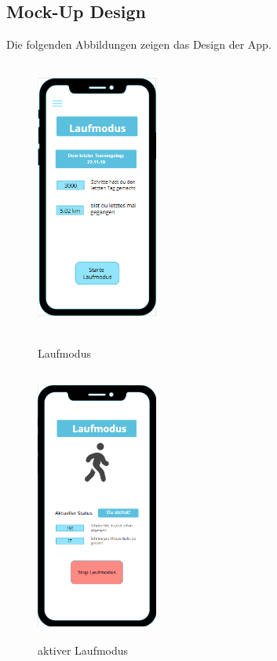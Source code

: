 \documentclass[a4paper,12pt]{article}
\begin{document}
\subsection{Mock-Up Design}
Die folgenden Abbildungen zeigen das Design der App.
\begin{figure}[ht!]
	\centering
		\begin{minipage}{0.4\textwidth}
			\includegraphics[width=4cm,height=9cm]{./Benutzeroberflaeche/Laufmodus.png}
			\caption{Laufmodus}
			\vspace{30px}
		\end{minipage}
			\hfill
		\begin{minipage}{0.4\textwidth}
			\includegraphics[width=4cm,height=9cm]{./Benutzeroberflaeche/Laufmodus_aktiv.png}
			\caption{aktiver Laufmodus}
			\vspace{30px}
		\end{minipage}

\end{figure}
\end{document}
